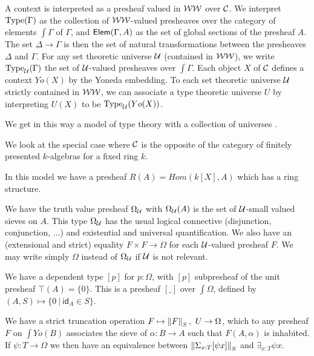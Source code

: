 A context is interpreted as a presheaf valued in $\mathcal{WW}$ over $\mathcal{C}$. We interpret $\mathrm{Type}(\Gamma)$ as the collection of
$\mathcal{WW}$-valued presheaves over the category of elements $\int\Gamma$ of $\Gamma$,
and $\mathsf{Elem}(\Gamma,A)$ as the set of global sections of the presheaf $A$. The set $\Delta\rightarrow\Gamma$ is then the set
of natural transformations between the presheaves $\Delta$ and $\Gamma$.
For any set theoretic universe $\mathcal{U}$ (contained in $\mathcal{WW}$), we write $\mathrm{Type}_{\mathcal{U}}(\Gamma)$ the set of $\mathcal{U}$-valued
presheaves over $\int\Gamma$. Each object $X$ of $\mathcal{C}$ defines a context $Yo(X)$ by the Yoneda embedding.
To each set theoretic universe $\mathcal{U}$ strictly contained in $\mathcal{WW}$, we can associate a type theoretic universe $U$ by interpreting
$U(X)$ to be $\mathrm{Type}_{\mathcal{U}}(Yo(X))$.

We get in this way a model of type theory with a collection of universes \cite{huber-phd-thesis}.

\medskip

We look at the special case where $\mathcal{C}$ is the opposite of the category of finitely presented $k$-algebras for a fixed
ring $k$.

    In this model we have a presheaf $R(A) = Hom(k[X],A)$ which has a ring structure.

    We have the truth value presheaf $\Omega_{\mathcal{U}}$ with $\Omega_{\mathcal{U}}(A)$ is the set of $\mathcal{U}$-small valued sieves on $A$.
    This type $\Omega_{\mathcal{U}}$ has the usual logical connective (disjunction, conjunction,
    $\dots$) and existential and universal quantification. We also have an (extensional and strict)
    equality $F\times F\rightarrow\Omega$ for each $\mathcal{U}$-valued presheaf $F$. We may write simply $\Omega$ instead
    of $\Omega_{\mathcal{U}}$ if $\mathcal{U}$ is not relevant.

    We have a dependent type $[p]$ for $p:\Omega$, with $[p]$ subpresheaf of the unit presheaf $\top(A) = \{0\}$.
    This is a presheaf $[\_]$
    over $\int\Omega$, defined by $(A,S)\mapsto \{0~|~\mathsf{id}_A\in S\}$.

    We have a strict truncation operation $F\mapsto \left\lVert F \right\rVert_S,~U\rightarrow\Omega$, which to any presheaf $F$ on $\int Yo(B)$
    associates the sieve of $\alpha:B\rightarrow A$ such that $F(A,\alpha)$ is inhabited. If $\psi:T\rightarrow\Omega$
    we then have an equivalence between  $\left\lVert \Sigma_{x:T}[\psi x] \right\rVert_S$ and $\exists_{x:T}\psi x$.
    
